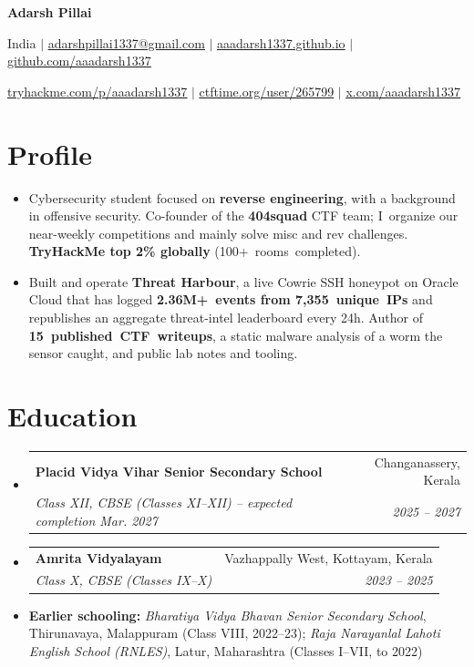\documentclass[letterpaper,11pt]{article}
\makeatletter
\newcommand{\resumeItem}[1]{
  \item\small{
    {#1\vspace{-2pt}}
  }
}
\newcommand{\resumeSubheading}[4]{
  \vspace{-2pt}\item
    \begin{tabular*}{\linewidth}[t]{l@{\extracolsep{\fill}}r}
      \textbf{#1} & #2 \\
      \textit{\small#3} & \textit{\small#4} \\
    \end{tabular*}\vspace{-7pt}
}
\newcommand{\resumeSubHeadingListStart}{\begin{itemize}[leftmargin=0.15in, label={}]}
\newcommand{\resumeSubHeadingListEnd}{\end{itemize}}
\makeatother
\begin{document}
\begin{center}
    {\Huge\bfseries Adarsh Pillai\par}
    \vspace{2pt}
    {\small
      India $|$ \href{mailto:adarshpillai1337@gmail.com}{\underline{adarshpillai1337@gmail.com}} $|$
      \href{https://aaadarsh1337.github.io/}{\underline{aaadarsh1337.github.io}} $|$
      \href{https://github.com/aaadarsh1337}{\underline{github.com/aaadarsh1337}}\par
      \vspace{2pt}
      \href{https://tryhackme.com/p/aaadarsh1337}{\underline{tryhackme.com/p/aaadarsh1337}} $|$
      \href{https://ctftime.org/user/265799}{\underline{ctftime.org/user/265799}} $|$
      \href{https://x.com/aaadarsh1337}{\underline{x.com/aaadarsh1337}}\par
    }
\end{center}


\section{Profile}
  \resumeSubHeadingListStart
    \resumeItem{Cybersecurity student focused on \textbf{reverse engineering}, with a background in offensive security. Co-founder of the \textbf{404squad} CTF team; I~organize our near-weekly competitions and mainly solve misc and rev challenges. \textbf{TryHackMe top 2\% globally} \mbox{(100+ rooms completed)}.}
    \resumeItem{Built and operate \textbf{Threat Harbour}, a live Cowrie SSH honeypot on Oracle Cloud that has logged \textbf{2.36M+~events from 7,355~unique~IPs} and republishes an aggregate threat-intel leaderboard every 24h. Author of \textbf{15~published~CTF~writeups}, a static malware analysis of a worm the sensor caught, and public lab notes and tooling.}
  \resumeSubHeadingListEnd


\section{Education}
  \resumeSubHeadingListStart
    \resumeSubheading
      {Placid Vidya Vihar Senior Secondary School}{Changanassery, Kerala}
      {Class XII, CBSE (Classes XI--XII) -- expected completion Mar. 2027}{2025 -- 2027}
    \resumeSubheading
      {Amrita Vidyalayam}{Vazhappally West, Kottayam, Kerala}
      {Class X, CBSE (Classes IX--X)}{2023 -- 2025}
    \resumeItem{\textbf{Earlier schooling:} \emph{Bharatiya Vidya Bhavan Senior Secondary School}, Thirunavaya, Malappuram (Class VIII, 2022--23); \emph{Raja Narayanlal Lahoti English School (RNLES)}, Latur, Maharashtra (Classes I--VII, to 2022)}
  \resumeSubHeadingListEnd
\end{document}
